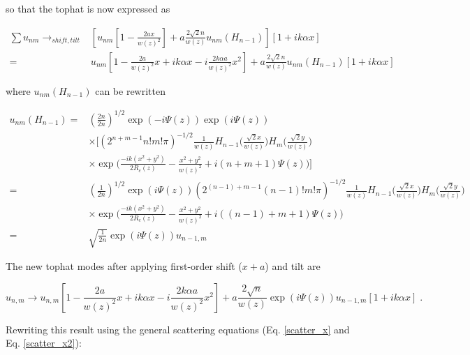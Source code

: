 \documentclass[aps,twoside,secnumarabic,balancelastpage,amsmath,amssymb,nofootinbib,hyperref=pdftex]{revtex4}
\begin{document}
so that the tophat is now expressed as

\begin{align*}
	\sum u_{nm} \rightarrow_{shift,tilt}&
    \left[
    u_{nm} 
    [
		1
		-
		\frac{2ax}{w(z)^2}]	
	+ 
	a \frac{2 \sqrt{2} n}{w(z)} 
	u_{nm}(H_{n-1}) \right]
	\left[
        1+ i k \alpha x
    \right]
    \\=&
     u_{nm}
        \left[
        1 - \frac{2 a }{w(z)^2} x + i k \alpha x - i \frac{2 k \alpha a}{w(z)^2} x^2 
    \right]
    + 
	a \frac{2 \sqrt{2} n}{w(z)} 
	u_{nm}(H_{n-1})
	\left[
        1+ i k \alpha x
    \right]
\end{align*}

where $u_{nm} (H_{n-1})$ can be rewritten

\begin{align*}
	u_{nm} (H_{n-1}) =&
	(\frac{2 n }{2 n})^{1/2}
			\exp(-i \Psi(z))\exp(i \Psi(z))
			\\& \times
	[
	(2^{n+m-1}n!m!\pi)^{-1/2}
		\frac{1}{w(z)}
		H_{n-1} \Big(\frac{\sqrt{2}x}{w(z)} \Big)
		H_{m} \Big(\frac{\sqrt{2}y}{w(z)} \Big)
	\\& \times		
		\exp \Big(\frac{-ik(x^{2}+y^{2})}{2R_{c}(z)}-
		\frac{x^{2}+y^{2}}{w(z)^{2}} 
		+i(n+m+1)\Psi(z)		
		\Big)
				]
		\\=&
		(\frac{1}{2 n}) ^{1/2}
		\exp(i \Psi(z))
			(2^{(n-1)+m-1}(n-1)!m!\pi)^{-1/2}
		\frac{1}{w(z)}
		H_{n-1} \Big(\frac{\sqrt{2}x}{w(z)} \Big)
		H_{m} \Big(\frac{\sqrt{2}y}{w(z)} \Big)
			\\& \times	
		\exp \Big(\frac{-ik(x^{2}+y^{2})}{2R_{c}(z)}-
		\frac{x^{2}+y^{2}}{w(z)^{2}} 
		+i( (n-1)+m+1)\Psi(z)			
		\Big)
		\\=&
		\sqrt{\frac{1}{2 n}}
		\exp(i \Psi(z))
		u_{n-1,m}
\end{align*}

The new tophat modes after applying first-order shift ($x+a$) and tilt are 

\begin{equation}\label{eq:prev}
	u_{n,m} \rightarrow
     u_{n,m}
        \left[
        1 - \frac{2 a }{w(z)^2} x + i k \alpha x - i \frac{2 k \alpha a}{w(z)^2} x^2 
    \right]
    + 
	a \frac{2 \sqrt{n}}{w(z)} 
	\exp(i \Psi(z))
	u_{n-1,m}
	\left[
        1+ i k \alpha x
    \right]	 \; .
\end{equation}

Rewriting this result using the general scattering equations (Eq. \ref{scatter_x} and Eq. \ref{scatter_x2}):
\end{document}
